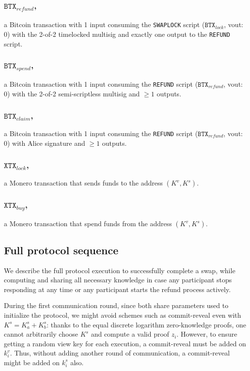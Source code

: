 \documentclass{llncs}
\newcommand{\BTX}{\texttt{BTX}}
\newcommand{\XTX}{\texttt{XTX}}
\begin{document}
\subsubsection{$\BTX_\textit{refund}$,}
a Bitcoin transaction with 1 input consuming the \texttt{SWAPLOCK} script ($\BTX_\textit{lock}$, vout: 0) with the 2-of-2 timelocked multisig and exactly one output to the \texttt{REFUND} script.

\subsubsection{$\BTX_\textit{spend}$,}
a Bitcoin transaction with 1 input consuming the \texttt{REFUND} script ($\BTX_\textit{refund}$, vout: 0) with the 2-of-2 semi-scriptless multisig and $\geq 1$ outputs.

\subsubsection{$\BTX_\textit{claim}$,}
a Bitcoin transaction with 1 input consuming the \texttt{REFUND} script ($\BTX_\textit{refund}$, vout: 0) with Alice signature and $\geq 1$ outputs.

\subsubsection{$\XTX_\textit{lock}$,}
a Monero transaction that sends funds to the address $(K^v,K^s)$.

\subsubsection{$\XTX_\textit{buy}$,}
a Monero transaction that spend funds from the address $(K^v,K^s)$.

\subsection{Full protocol sequence}
We describe the full protocol execution to successfully complete a swap, while computing and sharing all necessary knowledge in case any participant stops responding at any time or any participant starts the refund process actively.

During the first communication round, since both share parameters used to initialize the protocol, we might avoid schemes such as commit-reveal even with $K^s = K^s_a + K^s_b$: thanks to the equal discrete logarithm zero-knowledge proofs, one cannot arbitrarily choose $K^s$ and compute a valid proof $z_i$. However, to ensure getting a random view key for each execution, a commit-reveal must be added on $k^v_i$. Thus, without adding another round of communication, a commit-reveal might be added on $k^s_i$ also.
\end{document}
